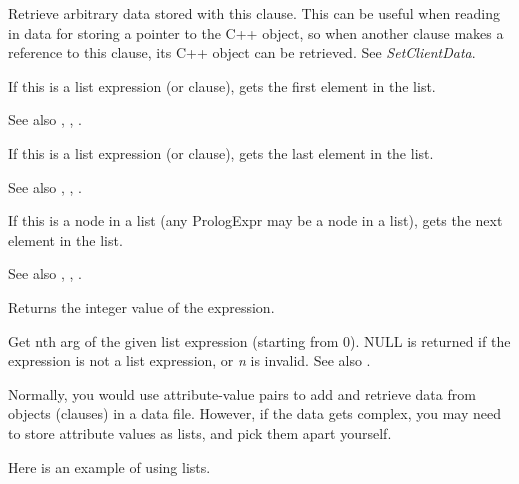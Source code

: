 
Retrieve arbitrary data stored with this clause. This can be useful when
reading in data for storing a pointer to the C++ object, so when another
clause makes a reference to this clause, its C++ object can be retrieved.
See {\it SetClientData}.

\label{getfirst}


If this is a list expression (or clause), gets the first element in the list.

See also , , .

\label{getlast}


If this is a list expression (or clause), gets the last element in the list.

See also , , .

\label{getnext}


If this is a node in a list (any PrologExpr may be a node in a list), gets the
next element in the list.

See also , , .



Returns the integer value of the expression.

\label{nth}


Get nth arg of the given list expression (starting from 0). NULL is returned if
the expression is not a list expression, or {\it n} is invalid. See also .

Normally, you would use attribute-value pairs to add and retrieve data
from objects (clauses) in a data file. However, if the data gets complex,
you may need to store attribute values as lists, and pick them apart
yourself.

Here is an example of using lists.

